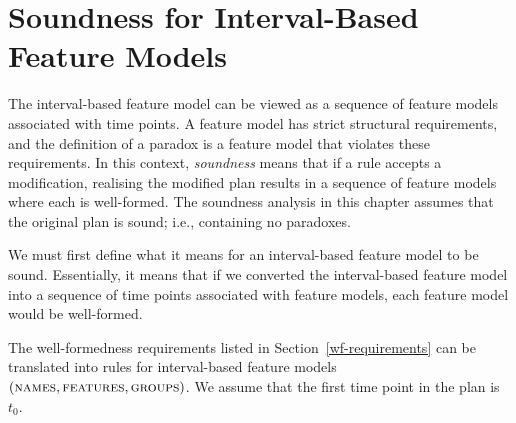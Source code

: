 \section{Soundness for Interval-Based Feature \break Models}
\label{sec:soundness-for-interval-based-feature-models}
The interval-based feature model can be viewed as a sequence of feature models associated with time points. A feature model has strict structural requirements, and the definition of a paradox is a feature model that violates these requirements. In this context, \emph{soundness} means that if a rule accepts a modification, realising the modified plan results in a sequence of feature models where each is well-formed. The soundness analysis in this chapter assumes that the original plan is sound; i.e., containing no paradoxes. 

We must first define what it means for an interval-based feature model to be sound. Essentially, it means that if we converted the interval-based feature model into a sequence of time points associated with feature models, each feature model would be well-formed.

The well-formedness requirements listed in Section~\vref{wf-requirements} can be translated into rules for interval-based feature models $(\textsc{names},\allowbreak \textsc{features}, \allowbreak \textsc{groups}{})$. We assume that the first time point in the plan is $t_0$.

